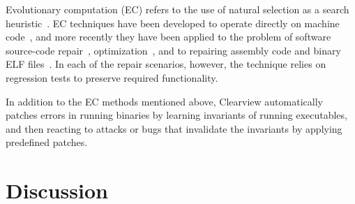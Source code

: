 \documentclass{sigcomm-alternate}
\begin{document}
Evolutionary computation (EC) refers to the use of natural selection
as a search heuristic~\cite{holland1992adaptation,koza1992genetic}.
EC techniques have been developed to operate 
directly on machine code~\cite{kuhling2002brute}, and more recently
they have been applied to the problem of software source-code
repair~\cite{weimer2009automatically,genprog-tse-journal},
optimization~\cite{sitthi2011genetic,schulte2013optimization}, and to
repairing assembly code and binary ELF
files~\cite{schulte2013embedded}.  In each of the repair scenarios,
however, the technique relies on regression tests to
preserve required functionality.


In addition to the EC methods mentioned above, Clearview \cite{clearview}
automatically patches errors in running binaries by learning
invariants of running executables, and then reacting to attacks or
bugs that invalidate the invariants by applying predefined patches.

\section{Discussion}
\label{sec:discussion}

\end{document}
